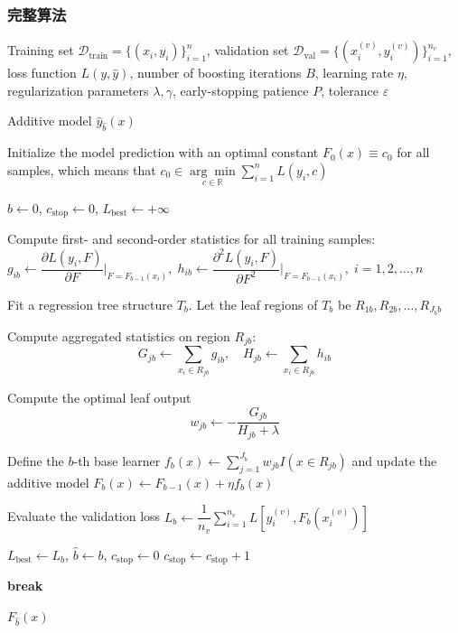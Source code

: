 \subsubsection{完整算法}
\begin{algorithm}[H]
	\caption{Extreme Gradient Boosting}
	\label{alg:XGBoost}
	\begin{algorithmic}[1]
		\Require Training set $\mathcal{D}_{\mathrm{train}}=\{(x_i,y_i)\}_{i=1}^n$,
		validation set $\mathcal{D}_{\mathrm{val}}=\{(x_i^{(v)},y_i^{(v)})\}_{i=1}^{n_v}$,
		loss function $L(y,\hat y)$,
		number of boosting iterations $B$,
		learning rate $\eta$,
		regularization parameters $\lambda,\gamma$,
		early-stopping patience $P$,
		tolerance $\varepsilon$
		
		\Ensure Additive model $\hat y_{\hat b}(x)$
		
		\State Initialize the model prediction with an optimal constant $F_0(x)\equiv c_0$ for all samples, which means that $c_0\in\underset{c\in\mathbb{R}}{\arg\min}\sum\limits_{i=1}^nL(y_i,c)$
		
		\State $\hat b\gets 0$, $c_{\mathrm{stop}}\gets 0$, $L_{\mathrm{best}}\gets +\infty$
		
		\State Compute first- and second-order statistics for all training samples:
		\State $g_{ib}\gets \dfrac{\partial L(y_i,F)}{\partial F}\big|_{F=F_{b-1}(x_i)},\;h_{ib}\gets \dfrac{\partial^2L(y_i,F)}{\partial F^2}\big|_{F=F_{b-1}(x_i)},\;i=1,2,\dots,n$
		
		\State Fit a regression tree structure $T_b$. Let the leaf regions of $T_b$ be $R_{1b},R_{2b},\dots,R_{J_b b}$
		
		\State Compute aggregated statistics on region $R_{jb}$:
		\begin{equation*}
			G_{jb}\gets\sum\limits_{x_i\in R_{jb}}g_{ib},\quad H_{jb}\gets\sum\limits_{x_i\in R_{jb}}h_{ib}
		\end{equation*}
		
		\State Compute the optimal leaf output
		\begin{equation*}
			w_{jb}\gets-\frac{G_{jb}}{H_{jb}+\lambda}
		\end{equation*}
		\EndFor
		
		\State Define the $b$-th base learner $f_b(x)\gets\sum\limits_{j=1}^{J_b}w_{jb}I(x\in R_{jb})$ and update the additive model $F_b(x)\gets F_{b-1}(x)+\eta f_b(x)$
		
		\State Evaluate the validation loss $L_b\gets\dfrac{1}{n_v}\sum\limits_{i=1}^{n_v}L[y_i^{(v)},F_b(x_i^{(v)})]$
		
		\State $L_{\mathrm{best}}\gets L_b$, $\hat b\gets b$, $c_{\mathrm{stop}}\gets 0$
		\Else
		\State $c_{\mathrm{stop}}\gets c_{\mathrm{stop}}+1$
		\EndIf
		
		\State \textbf{break}
		\EndIf
		\EndFor
		
		\State \Return $F_{\hat b}(x)$
	\end{algorithmic}
\end{algorithm}
